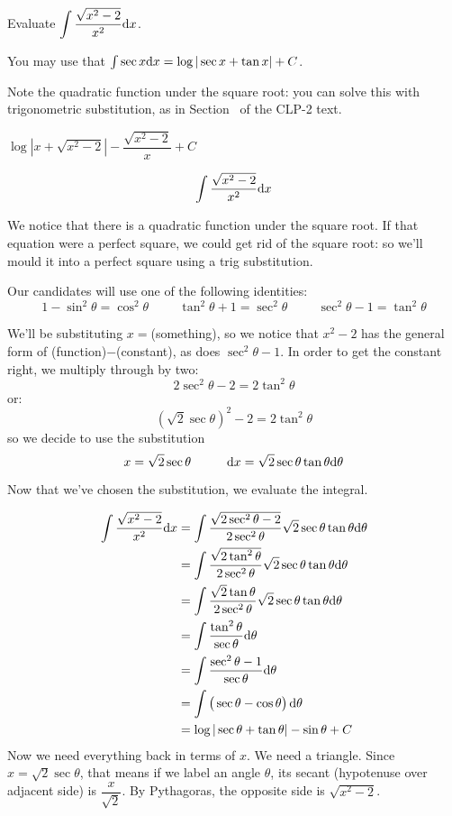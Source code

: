 \begin{question} Evaluate
$\displaystyle\int \frac{\sqrt{x^2-2}}{x^2}\mathrm{d}x$.

You may use that  $\int \sec x\mathrm{d}x = \log|\sec x+\tan x| +C$.
\end{question}

\begin{hint}
Note the quadratic function under the square root: you can solve this with trigonometric substitution, as in Section~ of the CLP-2 text.
\end{hint}

\begin{answer}
$\log \left| x+{\sqrt{x^2-2}}
\right|-\dfrac{\sqrt{x^2-2}}{x}+C$
\end{answer}

\begin{solution}

\[\int \frac{\sqrt{x^2-2}}{x^2}\mathrm{d}x\]

We notice that there is a quadratic function under the square root. If that equation were a perfect square, we could get rid of the square root: so we'll mould it into a perfect square using a trig substitution.

Our candidates will use one of the following identities:
\[1-\sin^2\theta=\cos^2\theta \hspace{1cm} \tan^2\theta+1=\sec^2\theta \hspace{1cm} \sec^2\theta-1=\tan^2\theta\]

We'll be substituting $x=$(something), so we notice that $x^2-2$ has the general form of
(function)$-$(constant), as does $\sec^2\theta-1$. In order to get the constant right, we multiply through by two:
\[2\sec^2\theta-2=2\tan^2\theta\]
or:
\[(\sqrt{2}\sec \theta)^2-2=2\tan^2\theta\]
so we decide to use the substitution
\[x=\sqrt{2}\sec\theta\hspace{1cm}\mathrm{d}x=\sqrt{2}\sec\theta\tan\theta \mathrm{d}\theta\]

Now that we've chosen the substitution, we evaluate the integral.

\begin{align*}
\int\frac{\sqrt{x^2-2}}{x^2}\mathrm{d}x&=\int\frac{\sqrt{2\sec^2\theta-2}}{2\sec^2\theta}\sqrt{2}\sec\theta\tan\theta \mathrm{d}\theta\\
&=\int
\frac{\sqrt{2\tan^2\theta}}{2\sec^2\theta}\sqrt{2}\sec\theta\tan\theta
\mathrm{d}\theta\\
&=\int
\frac{\sqrt{2}\tan\theta}{2\sec^2\theta}\sqrt{2}\sec\theta\tan\theta
\mathrm{d}\theta\\
&=\int
\frac{\tan^2\theta}{\sec\theta}
\mathrm{d}\theta\\
&=
\int \frac{\sec^2\theta-1}{\sec\theta}\mathrm{d}\theta\\
&=\int \big(\sec\theta-\cos\theta\big)\, \mathrm{d}\theta\\
&=\log|\sec\theta + \tan\theta|-\sin\theta +C
\end{align*}
Now we need everything back in terms of $x$. We need a triangle. Since $x=\sqrt{2}\sec\theta$, that means if we label an angle $\theta$, its secant (hypotenuse over adjacent side) is $\dfrac{x}{\sqrt{2}}$. By Pythagoras, the opposite side is $\sqrt{x^2-2}$.


\end{solution}
